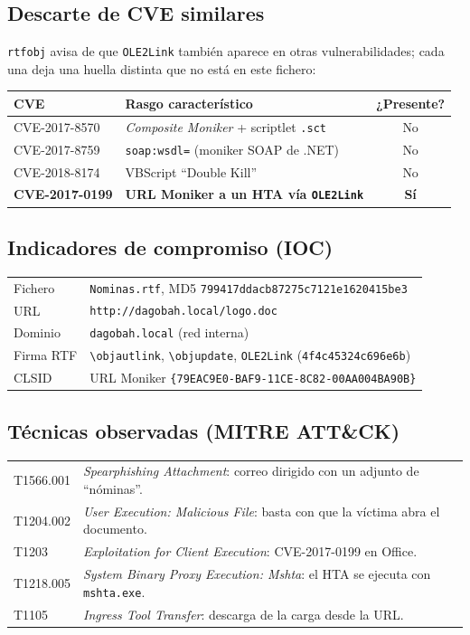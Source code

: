 \documentclass[11pt,a4paper]{article}
\newcommand{\bs}{\textbackslash\allowbreak{}}
\begin{document}
\subsection{Descarte de CVE similares}
\texttt{rtfobj} avisa de que \texttt{OLE2Link} también aparece en otras vulnerabilidades; cada una deja una huella
distinta que no está en este fichero:

\begin{tabularx}{\linewidth}{@{}lXc@{}}
\toprule
\textbf{CVE} & \textbf{Rasgo característico} & \textbf{¿Presente?} \\ \midrule
CVE-2017-8570 & \emph{Composite Moniker} + scriptlet \texttt{.sct} & No \\
CVE-2017-8759 & \texttt{soap:wsdl=} (moniker SOAP de .NET) & No \\
CVE-2018-8174 & VBScript ``Double Kill'' & No \\
\textbf{CVE-2017-0199} & \textbf{URL Moniker a un HTA vía \texttt{OLE2Link}} & \textbf{Sí} \\
\bottomrule
\end{tabularx}

\subsection{Indicadores de compromiso (IOC)}
\begin{tabularx}{\linewidth}{@{}lX@{}}
\toprule
Fichero & \texttt{Nominas.rtf}, MD5 \texttt{799417ddacb87275c7121e1620415be3} \\
URL & \texttt{http://dagobah.local/logo.doc} \\
Dominio & \texttt{dagobah.local} (red interna) \\
Firma RTF & \texttt{\bs objautlink}, \texttt{\bs objupdate}, \texttt{OLE2Link} (\texttt{4f4c45324c696e6b}) \\
CLSID & URL Moniker \texttt{\{79EAC9E0-\allowbreak BAF9-\allowbreak 11CE-\allowbreak 8C82-\allowbreak 00AA004BA90B\}} \\
\bottomrule
\end{tabularx}

\subsection{Técnicas observadas (MITRE ATT\&CK)}
\begin{tabularx}{\linewidth}{@{}lX@{}}
\toprule
T1566.001 & \emph{Spearphishing Attachment}: correo dirigido con un adjunto de ``nóminas''. \\
T1204.002 & \emph{User Execution: Malicious File}: basta con que la víctima abra el documento. \\
T1203 & \emph{Exploitation for Client Execution}: CVE-2017-0199 en Office. \\
T1218.005 & \emph{System Binary Proxy Execution: Mshta}: el HTA se ejecuta con \texttt{mshta.exe}. \\
T1105 & \emph{Ingress Tool Transfer}: descarga de la carga desde la URL. \\
\bottomrule
\end{tabularx}
\end{document}
